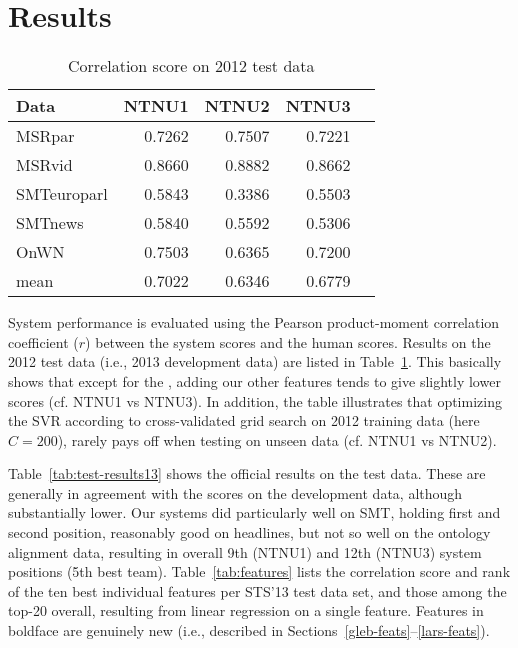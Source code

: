

\section{Results}
\label{results}

\begin{table}[t!]
\small
\centering
\begin{tabular*}{\linewidth}{@{\extracolsep{\fill}}lrrrr}
\toprule
Data & NTNU1 & NTNU2 & NTNU3  \\
\midrule
MSRpar      & 0.7262 & 0.7507 & 0.7221 \\
MSRvid      & 0.8660 & 0.8882 & 0.8662 \\
SMTeuroparl & 0.5843 & 0.3386 & 0.5503 \\
SMTnews     & 0.5840 & 0.5592 & 0.5306 \\
OnWN        & 0.7503 & 0.6365 & 0.7200 \\
\midrule
mean & 0.7022 & 0.6346 & 0.6779 \\ 
\bottomrule
\end{tabular*}
\caption{Correlation score on 2012 test data}
\vspace{4mm}
\label{tab:test-results12}
\end{table}

System performance is evaluated using the Pearson product-moment correlation coefficient ($r$)
between the system scores and the human scores.
Results on the 2012 test data (i.e., 2013 development data) are listed in Table~\ref{tab:test-results12}. 
This basically shows that except for the , 
adding our other features tends to give slightly lower scores (cf. NTNU1 vs NTNU3). 
In addition, the table illustrates that optimizing the SVR according to cross-validated grid search on 2012 training data 
(here $C=200$), rarely pays off when testing on unseen data (cf. NTNU1 vs NTNU2).   

Table~\ref{tab:test-results13} shows the official results on the test data. 
These are generally in agreement with the scores on the development data, although substantially lower. 
Our systems did particularly well on SMT, holding first and second position, 
reasonably good on headlines, but not so well on the ontology alignment data, 
resulting in overall 9th (NTNU1) and 12th (NTNU3) system positions 
(5th best team).
%
Table~\ref{tab:features} lists the correlation score and rank of the ten best individual features per  STS'13 test data set, and those among the top-20 overall,
resulting from linear regression on a single feature. 
Features in boldface are genuinely new (i.e., described in Sections~\ref{gleb-feats}--\ref{lars-feats}).

